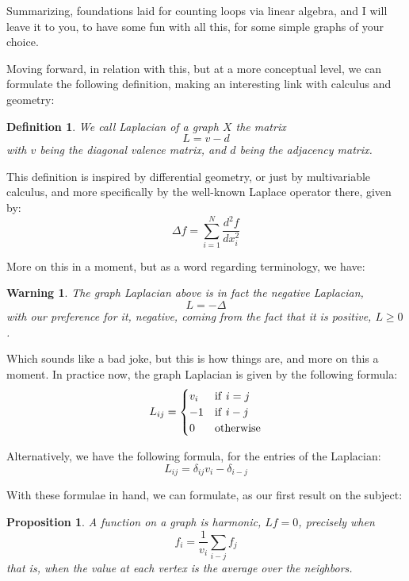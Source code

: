 \documentclass[12pt]{amsbook}
\newtheorem{definition}[theorem]{Definition}
\newtheorem{proposition}[theorem]{Proposition}
\newtheorem{warning}[theorem]{Warning}
\begin{document}
Summarizing, foundations laid for counting loops via linear algebra, and I will leave it to you, to have some fun with all this, for some simple graphs of your choice.

\bigskip

Moving forward, in relation with this, but at a more conceptual level, we can formulate the following definition, making an interesting link with calculus and geometry:


\begin{definition}
We call Laplacian of a graph $X$ the matrix
$$L=v-d$$
with $v$ being the diagonal valence matrix, and $d$ being the adjacency matrix.
\end{definition} 

This definition is inspired by differential geometry, or just by multivariable calculus, and more specifically by the well-known Laplace operator there, given by:
$$\Delta f=\sum_{i=1}^N\frac{d^2f}{dx_i^2}$$

More on this in a moment, but as a word regarding terminology, we have:


\begin{warning}
The graph Laplacian above is in fact the negative Laplacian,
$$L=-\Delta$$
with our preference for it, negative, coming from the fact that it is positive, $L\geq0$.
\end{warning}

Which sounds like a bad joke, but this is how things are, and more on this a moment. In practice now, the graph Laplacian is given by the following formula:
$$L_{ij}=\begin{cases}
v_i&{\rm if}\ i=j\\
-1&{\rm if}\ i-j\\
0&{\rm otherwise}
\end{cases}$$

Alternatively, we have the following formula, for the entries of the Laplacian:
$$L_{ij}=\delta_{ij}v_i-\delta_{i-j}$$

With these formulae in hand, we can formulate, as our first result on the subject:


\begin{proposition}
A function on a graph is harmonic, $Lf=0$, precisely when
$$f_i=\frac{1}{v_i}\sum_{i-j}f_j$$
that is, when the value at each vertex is the average over the neighbors.
\end{proposition}
\end{document}
